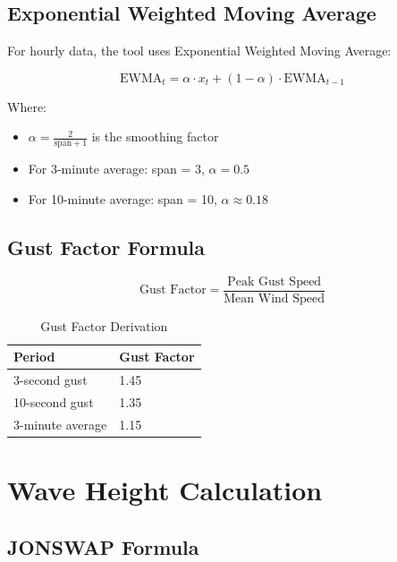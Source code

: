\documentclass[12pt]{article}
\begin{document}
\subsection{Exponential Weighted Moving Average}

For hourly data, the tool uses Exponential Weighted Moving Average:

\begin{equation}
\text{EWMA}_t = \alpha \cdot x_t + (1 - \alpha) \cdot \text{EWMA}_{t-1}
\end{equation}

Where:
\begin{itemize}
    \item $\alpha = \frac{2}{\text{span} + 1}$ is the smoothing factor
    \item For 3-minute average: span = 3, $\alpha = 0.5$
    \item For 10-minute average: span = 10, $\alpha \approx 0.18$
\end{itemize}

\subsection{Gust Factor Formula}

\begin{equation}
\text{Gust Factor} = \frac{\text{Peak Gust Speed}}{\text{Mean Wind Speed}}
\end{equation}

\begin{table}[h]
\centering
\begin{tabular}{|l|l|}
\hline
\textbf{Period} & \textbf{Gust Factor} \\
\hline
3-second gust & 1.45 \\
10-second gust & 1.35 \\
3-minute average & 1.15 \\
\hline
\end{tabular}
\caption{Gust Factor Derivation}
\end{table}

\newpage

\section{Wave Height Calculation}

\subsection{JONSWAP Formula}
\end{document}

